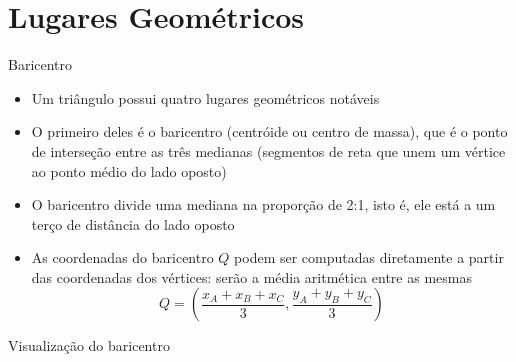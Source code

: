 \section{Lugares Geométricos}

\begin{frame}[fragile]{Baricentro}

    \begin{itemize}
        \item Um triângulo possui quatro lugares geométricos notáveis
        \pause

        \item O primeiro deles é o baricentro (centróide ou centro de massa), que é o ponto de 
            interseção entre as três medianas (segmentos de reta que unem um vértice ao ponto médio do lado oposto)
        \pause

        \item O baricentro divide uma mediana na proporção de 2:1, isto é, ele está a um terço de 
            distância do lado oposto
        \pause

        \item As coordenadas do baricentro $Q$ podem ser computadas diretamente a partir das 
            coordenadas dos vértices: serão a média aritmética entre as mesmas
        \[
            Q = \left(\frac{x_A + x_B + x_C}{3}, \frac{y_A + y_B + y_C}{3}\right)
        \]

    \end{itemize}

\end{frame}

\begin{frame}[fragile]{Visualização do baricentro}

    \begin{figure}
        \centering

    \end{figure}

\end{frame}

